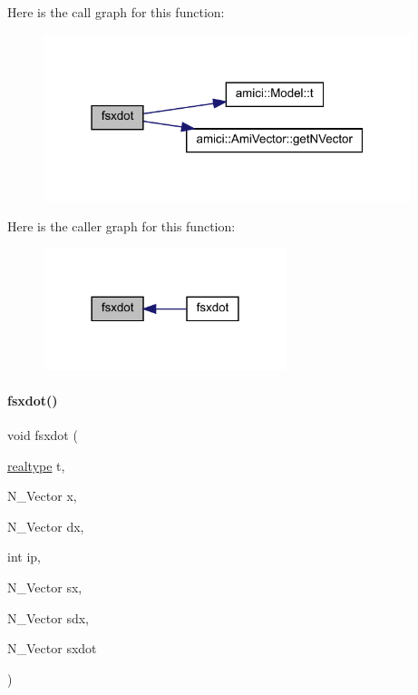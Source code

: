 Here is the call graph for this function\+:
\nopagebreak
\begin{figure}[H]
\begin{center}
\leavevmode
\includegraphics[width=304pt]{classamici_1_1_model___d_a_e_a01f84575fd8df46a04fd472bbbc9d821_cgraph}
\end{center}
\end{figure}
Here is the caller graph for this function\+:
\nopagebreak
\begin{figure}[H]
\begin{center}
\leavevmode
\includegraphics[width=201pt]{classamici_1_1_model___d_a_e_a01f84575fd8df46a04fd472bbbc9d821_icgraph}
\end{center}
\end{figure}
\mbox{\label{classamici_1_1_model___d_a_e_a26e76f86f173a718466c9cc19d68550a}} 
\paragraph{\texorpdfstring{fsxdot()}{fsxdot()}\hspace{0.1cm}{\footnotesize\ttfamily [2/3]}}
{\footnotesize\ttfamily void fsxdot (\begin{DoxyParamCaption}\item[{\mbox{\hyperlink{namespaceamici_a1bdce28051d6a53868f7ccbf5f2c14a3}{realtype}}}]{t,  }\item[{N\+\_\+\+Vector}]{x,  }\item[{N\+\_\+\+Vector}]{dx,  }\item[{int}]{ip,  }\item[{N\+\_\+\+Vector}]{sx,  }\item[{N\+\_\+\+Vector}]{sdx,  }\item[{N\+\_\+\+Vector}]{sxdot }\end{DoxyParamCaption})}


